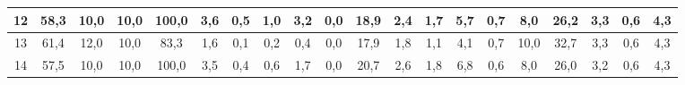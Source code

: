 \begin{sidewaystable}[]
\begin{tabular}{|c|c|c|c|c|c|c|c|c|c|c|c|c|c|c|c|c|c|c|c|}
    12 & 58,3                                            & 10,0                                            & 10,0                                            & 100,0                                           & 3,6                                             & 0,5                                             & 1,0                                             & 3,2                                             & 0,0                                             & 18,9                                             & 2,4                                              & 1,7                                              & 5,7                                              & 0,7                                              & 8,0                                              & 26,2                                             & 3,3                                              & 0,6                                              & 4,3                                              \\ \hline
    13 & 61,4                                            & 12,0                                            & 10,0                                            & 83,3                                            & 1,6                                             & 0,1                                             & 0,2                                             & 0,4                                             & 0,0                                             & 17,9                                             & 1,8                                              & 1,1                                              & 4,1                                              & 0,7                                              & 10,0                                             & 32,7                                             & 3,3                                              & 0,6                                              & 4,3                                              \\ \hline
    14 & 57,5                                            & 10,0                                            & 10,0                                            & 100,0                                           & 3,5                                             & 0,4                                             & 0,6                                             & 1,7                                             & 0,0                                             & 20,7                                             & 2,6                                              & 1,8                                              & 6,8                                              & 0,6                                              & 8,0                                              & 26,0                                             & 3,2                                              & 0,6                                              & 4,3                                              \\ \hline

\end{tabular}
\end{sidewaystable}
